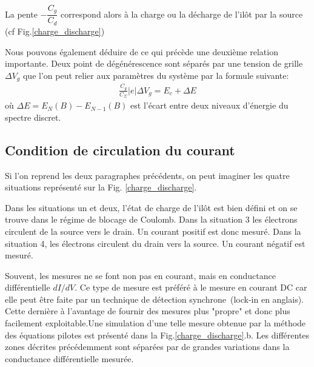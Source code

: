 La pente $-\dfrac{C_g}{C_d}$ correspond alors à la charge ou la décharge de l'il\^ot par la source (cf Fig.\ref{charge_discharge})

Nous pouvons également déduire de ce qui précède une deuxième relation importante. Deux point de dégénérescence sont séparés par une tension de grille $\Delta V_g$ que l'on peut relier aux paramètres du système par la formule suivante:
\begin{eqnarray}
\frac{C_g}{C_{\Sigma}} |e| \Delta V_g = E_c + \Delta E
\end{eqnarray}
où $\Delta E = E_N(B) - E_{N-1}(B)$ est l'écart entre deux niveaux d'énergie du spectre discret.
\subsection{Condition de circulation du courant}

Si l'on reprend les deux paragraphes précédents, on peut imaginer les quatre situations représenté sur la Fig. \ref{charge_discharge}.

Dans les situations un et deux, l'état de charge de l'il\^ot est bien défini et on se trouve dans le régime de blocage de Coulomb. Dans la situation 3 les électrons circulent de la source vers le drain. Un courant positif est donc mesuré. Dans la situation 4, les électrons circulent du drain vers la source. Un courant négatif est mesuré.

Souvent, les mesures ne se font non pas en courant, mais en conductance différentielle $dI/dV$. Ce type de mesure est préféré à le mesure en courant DC car elle peut \^etre faite par un technique de détection synchrone~(lock-in en anglais). Cette dernière à l'avantage de fournir des mesures plus "propre" et donc plus facilement exploitable.Une simulation d'une telle mesure obtenue par la méthode des équations pilotes est présenté dans la  Fig.\ref{charge_discharge}.b. Les différentes zones décrites précédemment sont séparées par de grandes variations dans la conductance différentielle mesurée.\newline





